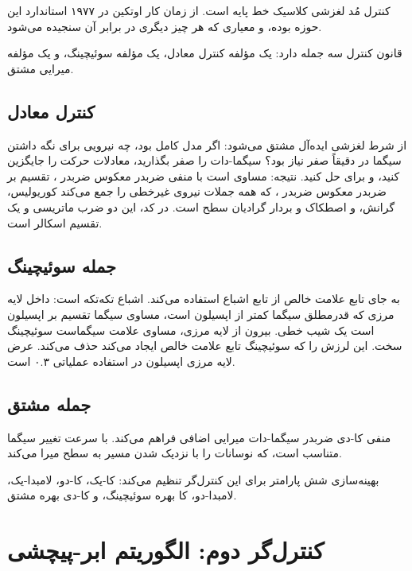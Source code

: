 \documentclass[12pt, a4paper]{article}
\newcommand{\dash}{\lr{---}}
\begin{document}
کنترل مُد لغزشی کلاسيک خط پايه است. از زمان کار اوتکين در ۱۹۷۷ استاندارد اين حوزه بوده، و معياری که هر چيز ديگری در برابر آن سنجيده می‌شود.

قانون کنترل سه جمله دارد: يک مؤلفه کنترل معادل، يک مؤلفه سوئيچينگ، و يک مؤلفه ميرايی مشتق.

\begin{center}
\mbox{}
\end{center}

\subsection{کنترل معادل}

از شرط لغزشی ايده‌آل مشتق می‌شود: اگر مدل کامل بود، چه نيرويی برای نگه داشتن سيگما در دقيقاً صفر نياز بود؟ سيگما-دات را صفر بگذاريد، معادلات حرکت را جايگزين کنيد، و برای  حل کنيد. نتيجه:  مساوی است با منفی  ضربدر معکوس  ضربدر ، تقسيم بر  ضربدر معکوس  ضربدر ، که  همه جملات نيروی غيرخطی را جمع می‌کند \dash{} کوريولیس، گرانش، و اصطکاک \dash{} و  بردار گراديان سطح است. در کد، اين دو ضرب ماتريسی و يک تقسيم اسکالر است.

\subsection{جمله سوئيچينگ}

به جای تابع علامت خالص از تابع اشباع استفاده می‌کند. اشباع تکه‌تکه است: داخل لايه مرزی که قدرمطلق سيگما کمتر از اپسيلون است، مساوی سيگما تقسيم بر اپسيلون است \dash{} يک شيب خطی. بيرون از لايه مرزی، مساوی علامت سيگماست \dash{} سوئيچينگ سخت. اين لرزش را که سوئيچينگ تابع علامت خالص ايجاد می‌کند حذف می‌کند. عرض لايه مرزی اپسيلون در استفاده عملياتی ۰.۳ است.

\subsection{جمله مشتق}

منفی کا-دی ضربدر سيگما-دات ميرايی اضافی فراهم می‌کند. با سرعت تغيير سيگما متناسب است، که نوسانات را با نزديک شدن مسير به سطح ميرا می‌کند.

بهينه‌سازی شش پارامتر برای اين کنترل‌گر تنظيم می‌کند: کا-يک، کا-دو، لامبدا-يک، لامبدا-دو، کا بهره سوئيچينگ، و کا-دی بهره مشتق.

\section{کنترل‌گر دوم: الگوريتم ابر-پيچشی}
\end{document}
